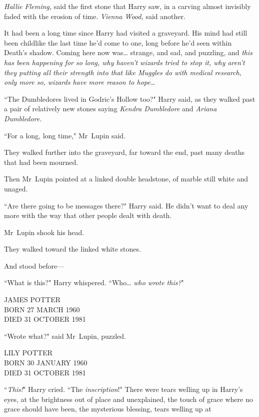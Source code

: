 \emph{Hallie Fleming,} said the first stone that Harry saw, in a carving almost invisibly faded with the erosion of time. \emph{Vienna Wood,} said another.

It had been a long time since Harry had visited a graveyard. His mind had still been childlike the last time he'd come to one, long before he'd seen within Death's shadow. Coming here now was{\ldots} strange, and sad, and puzzling, and \emph{this has been happening for so long, why haven't wizards tried to stop it, why aren't they putting all their strength into that like Muggles do with medical research, only more so, wizards have more reason to hope{\ldots}}

``The Dumbledores lived in Godric's Hollow too?" Harry said, as they walked past a pair of relatively new stones saying \emph{Kendra Dumbledore} and \emph{Ariana Dumbledore.}

``For a long, long time," Mr~Lupin said.

They walked further into the graveyard, far toward the end, past many deaths that had been mourned.

Then Mr~Lupin pointed at a linked double headstone, of marble still white and unaged.

``Are there going to be messages there?" Harry said. He didn't want to deal any more with the way that other people dealt with death.

Mr~Lupin shook his head.

They walked toward the linked white stones.

And stood before—

``What is this?" Harry whispered. ``Who{\ldots} \emph{who wrote this?}"

\begin{center}
JAMES POTTER\\
BORN 27 MARCH 1960\\
DIED 31 OCTOBER 1981
\end{center}

``Wrote what?" said Mr~Lupin, puzzled.

\begin{center}
LILY POTTER\\
BORN 30 JANUARY 1960\\
DIED 31 OCTOBER 1981
\end{center}

``\emph{This!}" Harry cried. ``The \emph{inscription}!" There were tears welling up in Harry's eyes, at the brightness out of place and unexplained, the touch of grace where no grace should have been, the mysterious blessing, tears welling up at

